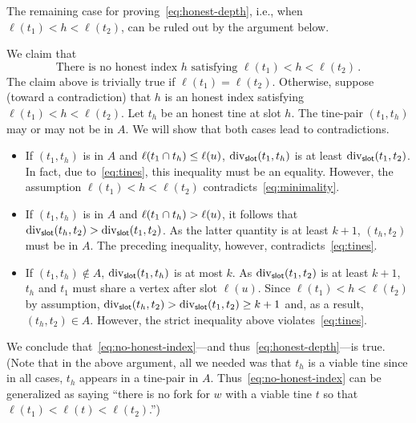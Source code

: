     The remaining case for proving~\eqref{eq:honest-depth}, 
    i.e., when $\ell(t_1) < h < \ell(t_2)$, 
    can be ruled out by the argument below.




    We claim that 
    \begin{equation}\label{eq:no-honest-index}
        \text{There is no honest index $h$ satisfying $\ell(t_1) < h < \ell(t_2)$}
        \,.
    \end{equation}
    The claim above is trivially true if $\ell(t_1) = \ell(t_2)$.
    Otherwise, suppose (toward a contradiction) 
    that $h$ is an honest index satisfying $\ell(t_1) < h < \ell(t_2)$. 
    Let $t_h$ be an honest tine at slot $h$. 
    The tine-pair $(t_1, t_h)$ may or may not be in $A$. 
    We will show that both cases lead to contradictions.
    \begin{itemize}
      \item If $(t_1, t_h)$ is in $A$ and $\ell(t_1 \cap t_h) \leq \ell(u)$, 
      $\mathrm{div}_{\mathsf{slot}}(t_1, t_h)$ is at least $\mathrm{div}_{\mathsf{slot}}(t_1, t_2)$. 
      In fact, due to~\eqref{eq:tines}, this inequality must be an equality. 
      However, the assumption $\ell(t_1) < h < \ell(t_2)$ contradicts~\eqref{eq:minimality}. 

      \item If $(t_1, t_h)$ is in $A$ and $\ell(t_1 \cap t_h) > \ell(u)$, 
      it follows that $\mathrm{div}_{\mathsf{slot}}(t_h, t_2) > \mathrm{div}_{\mathsf{slot}}(t_1, t_2)$. 
      As the latter quantity is at least $k + 1$, $(t_h, t_2)$ must be in $A$. 
      The preceding inequality, however, contradicts~\eqref{eq:tines}.

      \item If $(t_1, t_h) \not \in A$, 
      $\mathrm{div}_{\mathsf{slot}}(t_1, t_h)$ is at most $k$.
      As $\mathrm{div}_{\mathsf{slot}}(t_1, t_2)$ is at least $k + 1$, 
      $t_h$ and $t_1$ must share a vertex after slot $\ell(u)$. 
      Since $\ell(t_1) < h < \ell(t_2)$ by assumption, 
      $\mathrm{div}_{\mathsf{slot}}(t_h, t_2) > \mathrm{div}_{\mathsf{slot}}(t_1, t_2) \geq k + 1$ 
      and, as a result, $(t_h, t_2) \in A$. 
      However, the strict inequality above violates~\eqref{eq:tines}. 
    \end{itemize}
    We conclude that~\eqref{eq:no-honest-index}---and thus~\eqref{eq:honest-depth}---is true. 
    (Note that in the above argument, all we needed was that $t_h$ is a viable tine 
    since in all cases, $t_h$ appears in a tine-pair in $A$. 
    Thus~\eqref{eq:no-honest-index} can be generalized as saying 
    ``there is no fork for $w$ with a viable tine $t$ so that $\ell(t_1) < \ell(t) < \ell(t_2)$.'')
    


